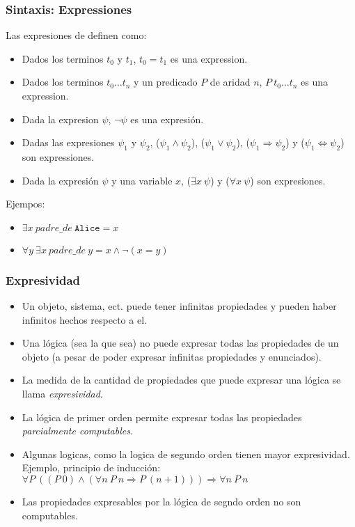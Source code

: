 \documentclass{beamer}
\begin{document}
\begin{frame}
    \frametitle{Sintaxis: Expressiones}
    Las expresiones de definen como:
    \begin{itemize}
        \item{Dados los terminos $t_0$ y $t_1$, $t_0=t_1$ es una expression.}
        \item{Dados los terminos $t_0\ldots t_n$ y un predicado $P$ de aridad $n$, $P\ t_0\ldots t_n$ es una expression.}
        \item{Dada la expresion $\psi$, $\neg\psi$ es una expresi\'on.}
        \item{Dadas las expresiones $\psi_1$ y $\psi_2$, ($\psi_1\wedge\psi_2$), ($\psi_1\vee\psi_2$), ($\psi_1\Rightarrow\psi_2$) y ($\psi_1\Leftrightarrow\psi_2$) son expressiones.}
        \item{Dada la expresi\'on $\psi$ y una variable $x$, ($\exists x\ \psi$) y ($\forall x\ \psi$) son expresiones.}
    \end{itemize}
    Ejempos:
    \begin{itemize}
        \item $\exists x\ padre\_de\ \mathtt{Alice}=x$
        \item $\forall y\ \exists x\ padre\_de\ y=x\wedge \neg(x=y)$
    \end{itemize}
\end{frame}

\begin{frame}
    \frametitle{Expresividad}
    \begin{itemize}
        \item{Un objeto, sistema, ect. puede tener infinitas propiedades y pueden
        haber infinitos hechos respecto a el.}
        \item{Una l\'ogica (sea la que sea) no puede expresar todas las propiedades
        de un objeto (a pesar de poder expresar infinitas propiedades y enunciados).}
        \item{La medida de la cantidad de propiedades que puede expresar una l\'ogica
        se llama \emph{expresividad}.}
        \item{La l\'ogica de primer orden permite expresar todas las propiedades
        \emph{parcialmente computables}.}
        \item{Algunas logicas, como la logica de segundo orden tienen mayor expresividad.
        Ejemplo, principio de inducci\'on: $\forall P\ ((P\ 0)\wedge(\forall n\ P\ n\Rightarrow P\ (n+1)))\Rightarrow \forall n\ P\ n$}
        \item{Las propiedades expresables por la l\'ogica de segndo orden no son computables.}
    \end{itemize}
\end{frame}
\end{document}
